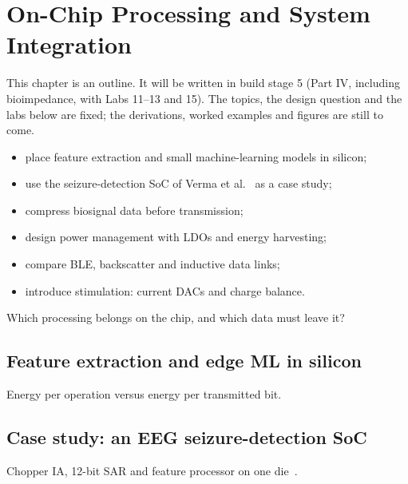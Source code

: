 \chapter{On-Chip Processing and System Integration}\label{ch:soc}

\begin{specnote}
This chapter is an outline. It will be written in build stage 5 (Part IV, including bioimpedance, with Labs 11--13 and 15). The topics, the design question and the labs below are fixed; the derivations, worked examples and figures are still to come.
\end{specnote}

\begin{objectives}
\begin{itemize}
  \item place feature extraction and small machine-learning models in silicon;
  \item use the seizure-detection SoC of Verma et al.~\cite{verma2010} as a case study;
  \item compress biosignal data before transmission;
  \item design power management with LDOs and energy harvesting;
  \item compare BLE, backscatter and inductive data links;
  \item introduce stimulation: current DACs and charge balance.
\end{itemize}
\end{objectives}

\begin{insight}
Which processing belongs on the \OB{} chip, and which data must leave it?
\end{insight}

\section{Feature extraction and edge ML in silicon}\label{sec:ch27-1}
Energy per operation versus energy per transmitted bit.

\section{Case study: an EEG seizure-detection SoC}\label{sec:ch27-2}
Chopper IA, 12-bit SAR and feature processor on one die~\cite{verma2010}.

